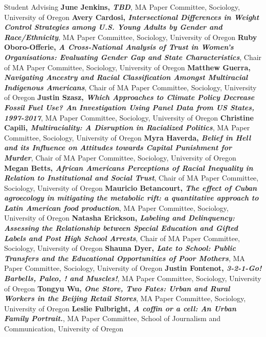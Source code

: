 \begin{rubric}{Student Advising}
\entry*[Current] \textbf{June Jenkins, \emph{TBD}}, MA Paper Committee, Sociology, University of Oregon  
\entry*[Current] \textbf{Avery Cardosi, \emph{Intersectional Differences in Weight Control Strategies among U.S. Young Adults by Gender and Race/Ethnicity}}, MA Paper Committee, Sociology, University of Oregon  
\entry*[2025] \textbf{Ruby Oboro-Offerie, \emph{A Cross-National Analysis of Trust in Women's Organisations: Evaluating Gender Gap and State Characteristics}}, Chair of MA Paper Committee, Sociology, University of Oregon  
\entry*[2025] \textbf{Matthew Guerra, \emph{Navigating Ancestry and Racial Classification Amongst Multiracial Indigenous Americans}}, Chair of MA Paper Committee, Sociology, University of Oregon  
\entry*[2022] \textbf{Justin Szasz, \emph{Which Approaches to Climate Policy Decrease Fossil Fuel Use? An Investigation Using Panel Data from US States, 1997-2017}}, MA Paper Committee, Sociology, University of Oregon  
\entry*[2022] \textbf{Christine Capili, \emph{Multiraciality: A Disruption in Racialized Politics}}, MA Paper Committee, Sociology, University of Oregon  
\entry*[2021] \textbf{Myra Haverda, \emph{Belief in Hell and its Influence on Attitudes towards Capital Punishment for Murder}}, Chair of MA Paper Committee, Sociology, University of Oregon  
\entry*[2021] \textbf{Megan Betts, \emph{African American\textquotesingle{}s Perceptions of Racial Inequality in Relation to Institutional and Social Trust}}, Chair of MA Paper Committee, Sociology, University of Oregon  
\entry*[2019] \textbf{Mauricio Betancourt, \emph{The effect of Cuban agroecology in mitigating the metabolic rift: a quantitative approach to Latin American food production}}, MA Paper Committee, Sociology, University of Oregon  
\entry*[2018] \textbf{Natasha Erickson, \emph{Labeling and Delinquency: Assessing the Relationship between Special Education and Gifted Labels and Post High School Arrests}}, Chair of MA Paper Committee, Sociology, University of Oregon  
\entry*[2014] \textbf{Shauna Dyer, \emph{Late to School: Public Transfers and the Educational Opportunities of Poor Mothers}}, MA Paper Committee, Sociology, University of Oregon  
\entry*[2014] \textbf{Justin Fontenot, \emph{3-2-1-Go! Barbells, Paleo, ! and Muscles!}}, MA Paper Committee, Sociology, University of Oregon  
\entry*[2012] \textbf{Tongyu Wu, \emph{One Store, Two Fates: Urban and Rural Workers in the Beijing Retail Stores}}, MA Paper Committee, Sociology, University of Oregon  
\entry*[2012] \textbf{Leslie Fulbright, \emph{A coffin or a cell: An Urban Family Portrait.}}, MA Paper Committee, School of Journalism and Communication, University of Oregon  

\end{rubric}
